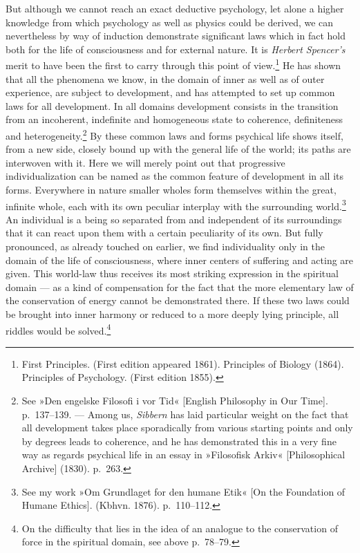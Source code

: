 \documentclass[12pt,a4paper]{book}
\newcommand{\opage}[1]{\marginnote{\footnotesize\textit{[#1]}}}
\begin{document}
But although we cannot reach an exact deductive psychology, let alone a
higher knowledge from which psychology as well as physics could be
derived, we can nevertheless by way of induction demonstrate significant
laws which in fact hold both for the life of consciousness and for
external nature. It is \emph{Herbert Spencer's} merit to have been the
first to carry through this
point of view.\footnote{First Principles. (First edition appeared 1861).
Principles of Biology (1864). Principles of Psychology. (First edition
1855).} He has shown that all the phenomena we know, in the domain of
inner as well as of outer experience, are subject to development, and has
attempted to set up common laws for all development. In all domains
development consists in the transition from an
\opage{102}incoherent, indefinite and homogeneous state to coherence,
definiteness and heterogeneity.\footnote{See »Den engelske Filosofi i
vor Tid« [English Philosophy in Our Time]. p.~137--139. --- Among us,
\emph{Sibbern} has laid particular weight on the fact that all
development takes place sporadically from various starting points and
only by degrees leads to coherence, and he has demonstrated this in a very
fine way as regards psychical life in an essay in »Filosofisk Arkiv«
[Philosophical Archive] (1830). p.~263.} By these common laws and forms
psychical life shows itself, from a new side, closely bound up with the
general life of the world; its paths are interwoven with it. Here we will
merely point out that progressive individualization can be named as the
common feature of development in all its forms. Everywhere in nature
smaller wholes form themselves within the great, infinite whole, each with
its own peculiar interplay with the surrounding world.\footnote{See my
work »Om Grundlaget for den humane Etik« [On the Foundation of Humane
Ethics]. (Kbhvn. 1876). p.~110--112.} An individual is a being so
separated from and independent of its surroundings that it can react upon
them with a certain peculiarity of its own. But fully pronounced, as
already touched on earlier, we find individuality only in the domain of
the life of consciousness, where inner centers of suffering and acting
are given. This world-law thus receives its most striking expression in
the spiritual domain --- as a kind of compensation for the
fact that the more elementary law of the conservation of energy cannot
be demonstrated there. If these two laws could be brought into inner
harmony or reduced to a more deeply lying principle, all riddles would be
solved.\footnote{On the difficulty that lies in the idea of an analogue
to the conservation of force in the spiritual domain, see above
p.~78--79.}
\end{document}
